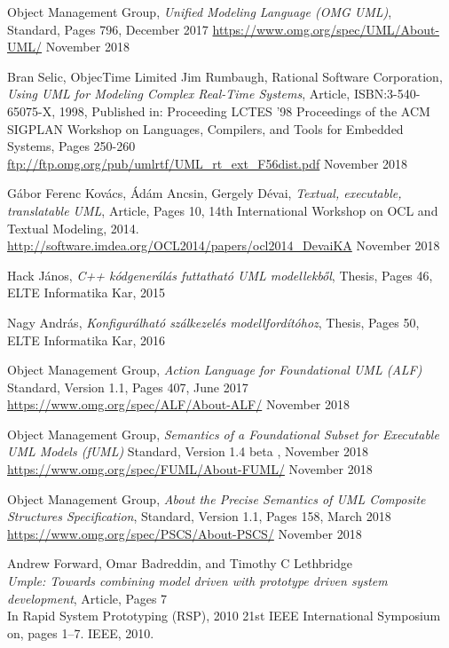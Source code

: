 \documentclass[a4paper,12pt]{report}
\begin{document}
\begin{thebibliography}{4}


	Object Management Group, 
	\emph{Unified Modeling Language (OMG UML)}, \\
	Standard, Pages 796, December 2017
	\url{https://www.omg.org/spec/UML/About-UML/} November 2018

	Bran Selic, ObjecTime Limited 
	Jim Rumbaugh, Rational Software Corporation,
	\emph{Using UML for Modeling Complex Real-Time Systems}, Article,
	ISBN:3-540-65075-X, 1998, Published in: Proceeding
LCTES '98 Proceedings of the ACM SIGPLAN Workshop on Languages, Compilers, and Tools for Embedded Systems, Pages 250-260  \\
	\url{ftp://ftp.omg.org/pub/umlrtf/UML_rt_ext_F56dist.pdf} November 2018
	
  Gábor Ferenc Kovács, Ádám Ancsin, Gergely Dévai,
  \emph{Textual, executable, translatable UML}, Article, Pages 10,
  14th International Workshop on OCL and Textual Modeling, 2014. 
  \url{http://software.imdea.org/OCL2014/papers/ocl2014_DevaiKA} November 2018
  
  
	Hack János, 
	\emph{C++ kódgenerálás futtatható UML modellekből}, 
	Thesis, Pages 46, ELTE Informatika Kar, 2015
	
	Nagy András, 
	\emph{Konfigurálható szálkezelés modellfordítóhoz}, 
	Thesis, Pages 50, ELTE Informatika Kar, 2016


	Object Management Group,
	\emph{Action Language for Foundational UML (ALF)}
	Standard, Version 1.1, Pages 407, June 2017\\
	\url{https://www.omg.org/spec/ALF/About-ALF/} November 2018
	
	
	Object Management Group,  \emph{Semantics of a Foundational Subset for Executable UML Models (fUML)} 
	Standard, Version 1.4 beta , November 2018\\
	\url{https://www.omg.org/spec/FUML/About-FUML/} November 2018

	Object Management Group, \emph{About the Precise Semantics of UML Composite Structures Specification}, Standard, Version 1.1, Pages 158, March 2018\\
	\url{https://www.omg.org/spec/PSCS/About-PSCS/} November 2018
	
	Andrew Forward, Omar Badreddin, and Timothy C Lethbridge \\
	\emph{Umple: Towards combining model driven with prototype driven system development}, Article, Pages 7 \\
	In Rapid System Prototyping (RSP), 2010 21st IEEE International Symposium on, pages 1–7. IEEE, 2010.


\end{thebibliography}
\end{document}
